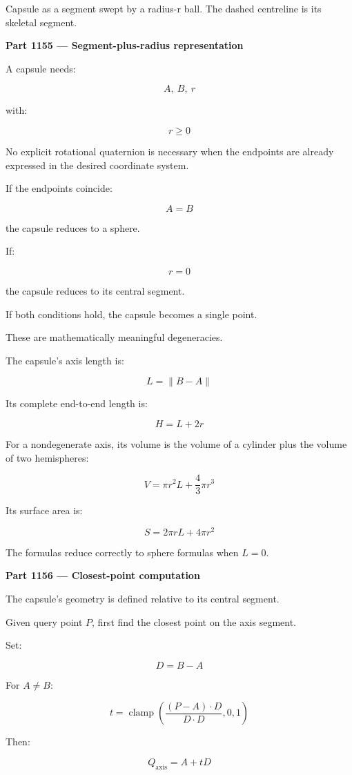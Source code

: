Capsule as a segment swept by a radius-r ball. The dashed centreline is its skeletal segment.

\textbf{Part 1155 --- Segment-plus-radius representation}

A capsule needs:

\[
A,\ B,\ r
\]

with:

\[
r\ge0
\]

No explicit rotational quaternion is necessary when the endpoints are already expressed in the desired coordinate system.

If the endpoints coincide:

\[
A=B
\]

the capsule reduces to a sphere.

If:

\[
r=0
\]

the capsule reduces to its central segment.

If both conditions hold, the capsule becomes a single point.

These are mathematically meaningful degeneracies.

The capsule's axis length is:

\[
L=\|B-A\|
\]

Its complete end-to-end length is:

\[
H=L+2r
\]

For a nondegenerate axis, its volume is the volume of a cylinder plus the volume of two hemispheres:

\[
\boxed{ V=\pi r^2L+\frac43\pi r^3 }
\]

Its surface area is:

\[
\boxed{ S=2\pi rL+4\pi r^2 }
\]

The formulas reduce correctly to sphere formulas when \(L=0\).

\textbf{Part 1156 --- Closest-point computation}

The capsule's geometry is defined relative to its central segment.

Given query point \(P\), first find the closest point on the axis segment.

Set:

\[
D=B-A
\]

For \(A\ne B\):

\[
t=\operatorname{clamp} \left( \frac{(P-A)\cdot D}{D\cdot D}, 0,1 \right)
\]

Then:

\[
\boxed{Q_{\mathrm{axis}}=A+tD}
\]

